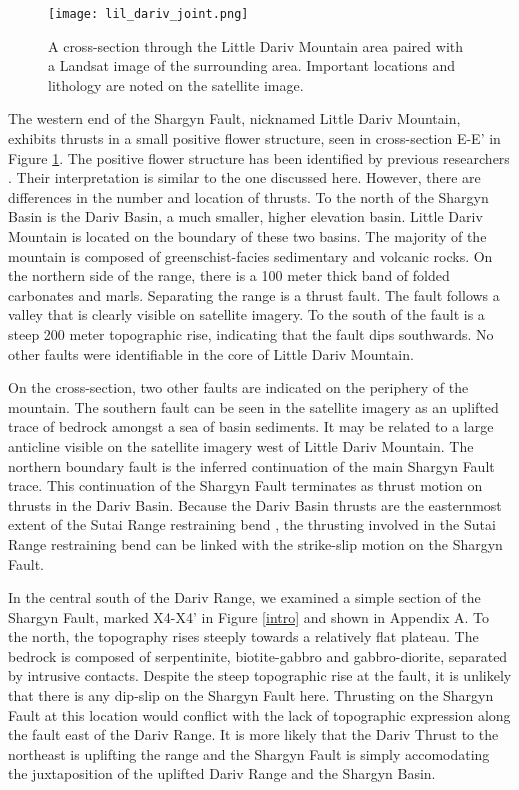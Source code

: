 \begin{figure}[h!]
  \centering
  \texttt{[image: lil\_dariv\_joint.png]}
  \caption{A cross-section through the Little Dariv Mountain area paired with a Landsat image of the surrounding area. Important locations and lithology are noted on the satellite image.}
  \label{lil_dariv_joint}
\end{figure}
\clearpage
The western end of the Shargyn Fault, nicknamed Little Dariv Mountain, exhibits thrusts in a small positive flower structure, seen in cross-section E-E' in Figure \ref{lil_dariv_joint}. The positive flower structure has been identified by previous researchers \citep{Howard2006}. Their interpretation is similar to the one discussed here. However, there are differences in the number and location of thrusts. To the north of the Shargyn Basin is the Dariv Basin, a much smaller, higher elevation basin. Little Dariv Mountain is located on the boundary of these two basins. The majority of the mountain is composed of greenschist-facies sedimentary and volcanic rocks. On the northern side of the range, there is a 100 meter thick band of folded carbonates and marls. Separating the range is a thrust fault. The fault follows a valley that is clearly visible on satellite imagery. To the south of the fault is a steep 200 meter topographic rise, indicating that the fault dips southwards. No other faults were identifiable in the core of Little Dariv Mountain. 

On the cross-section, two other faults are indicated on the periphery of the mountain. The southern fault can be seen in the satellite imagery as an uplifted trace of bedrock amongst a sea of basin sediments. It may be related to a large anticline visible on the satellite imagery west of Little Dariv Mountain. The northern boundary fault is the inferred continuation of the main Shargyn Fault trace.  This continuation of the Shargyn Fault terminates as thrust motion on thrusts in the Dariv Basin. Because the Dariv Basin thrusts are the easternmost extent of the Sutai Range restraining bend \citep{Cunningham2003}, the thrusting involved in the Sutai Range restraining bend can be linked with the strike-slip motion on the Shargyn Fault. 

In the central south of the Dariv Range, we examined a simple section of the Shargyn Fault, marked X4-X4' in Figure \ref{intro} and shown in Appendix A. To the north, the topography rises steeply towards a relatively flat plateau. The bedrock is composed of serpentinite, biotite-gabbro and gabbro-diorite, separated by intrusive contacts. Despite the steep topographic rise at the fault, it is unlikely that there is any dip-slip on the Shargyn Fault here. Thrusting on the Shargyn Fault at this location would conflict with the lack of topographic expression along the fault east of the Dariv Range. It is more likely that the Dariv Thrust to the northeast is uplifting the range and the Shargyn Fault is simply accomodating the juxtaposition of the uplifted Dariv Range and the Shargyn Basin. 

